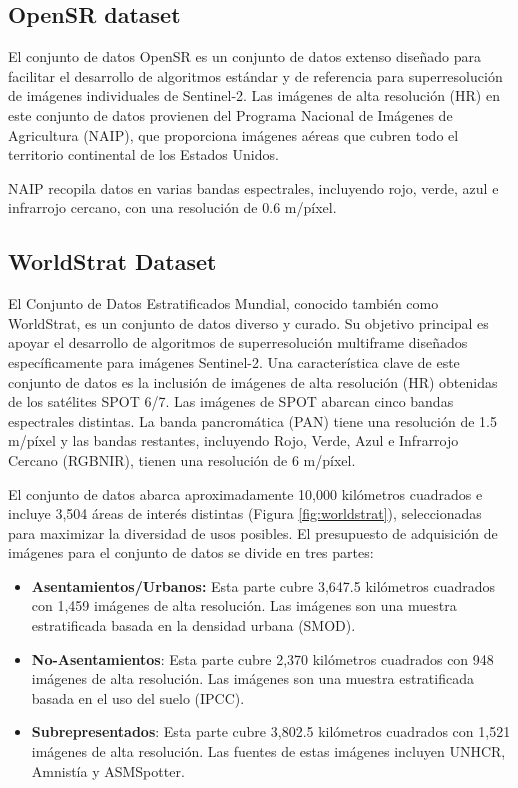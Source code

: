 \subsection{OpenSR dataset}
El conjunto de datos OpenSR es un conjunto de datos extenso diseñado para facilitar el desarrollo de algoritmos estándar y de referencia para superresolución de imágenes individuales de Sentinel-2. Las imágenes de alta resolución (HR) en este conjunto de datos provienen del Programa Nacional de Imágenes de Agricultura (NAIP), que proporciona imágenes aéreas que cubren todo el territorio continental de los Estados Unidos.

NAIP recopila datos en varias bandas espectrales, incluyendo rojo, verde, azul e infrarrojo cercano, con una resolución de 0.6 m/píxel.

\subsection{WorldStrat Dataset}
El Conjunto de Datos Estratificados Mundial, conocido también como WorldStrat, es un conjunto de datos diverso y curado. Su objetivo principal es apoyar el desarrollo de algoritmos de superresolución multiframe diseñados específicamente para imágenes Sentinel-2. Una característica clave de este conjunto de datos es la inclusión de imágenes de alta resolución (HR) obtenidas de los satélites SPOT 6/7. Las imágenes de SPOT abarcan cinco bandas espectrales distintas. La banda pancromática (PAN) tiene una resolución de 1.5 m/píxel y las bandas restantes, incluyendo Rojo, Verde, Azul e Infrarrojo Cercano (RGBNIR), tienen una resolución de 6 m/píxel.

El conjunto de datos abarca aproximadamente 10,000 kilómetros cuadrados e incluye 3,504 áreas de interés distintas (Figura \ref{fig:worldstrat}), seleccionadas para maximizar la diversidad de usos posibles. El presupuesto de adquisición de imágenes para el conjunto de datos se divide en tres partes:

\begin{itemize}
    \item \textbf{Asentamientos/Urbanos:} Esta parte cubre 3,647.5 kilómetros cuadrados con 1,459 imágenes de alta resolución. Las imágenes son una muestra estratificada basada en la densidad urbana (SMOD).
    \item \textbf{No-Asentamientos}: Esta parte cubre 2,370 kilómetros cuadrados con 948 imágenes de alta resolución. Las imágenes son una muestra estratificada basada en el uso del suelo (IPCC).
    \item \textbf{Subrepresentados}: Esta parte cubre 3,802.5 kilómetros cuadrados con 1,521 imágenes de alta resolución. Las fuentes de estas imágenes incluyen UNHCR, Amnistía y ASMSpotter.
\end{itemize}

